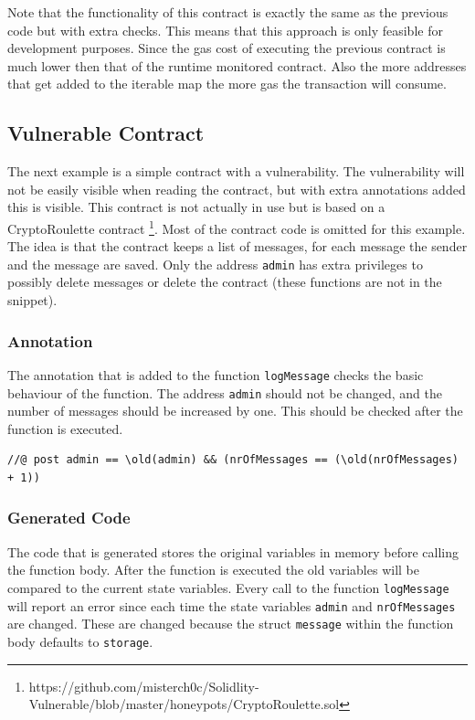 \documentclass[a4paper]{article}
\begin{document}
Note that the functionality of this contract is exactly the same as the previous code but with extra checks. This means that this approach is only feasible for development purposes. Since the gas cost of executing the previous contract is much lower then that of the runtime monitored contract. Also the more addresses that get added to the iterable map the more gas the transaction will consume.


\subsection{Vulnerable Contract}
The next example is a simple contract with a vulnerability. The vulnerability will not be easily visible when reading the contract, but with extra annotations added this is visible. This contract is not actually in use but is based on a CryptoRoulette contract \footnote{https://github.com/misterch0c/Solidlity-Vulnerable/blob/master/honeypots/CryptoRoulette.sol}. Most of the contract code is omitted for this example. The idea is that the contract keeps a list of messages, for each message the sender and the message are saved. Only the address \texttt{admin} has extra privileges to possibly delete messages or delete the contract (these functions are not in the snippet).


\subsubsection{Annotation}
The annotation that is added to the function \texttt{logMessage} checks the basic behaviour of the function. The address \texttt{admin} should not be changed, and the number of messages should be increased by one. This should be checked after the function is executed.
\begin{lstlisting}[basicstyle=\ttfamily, breaklines=true ]
//@ post admin == \old(admin) && (nrOfMessages == (\old(nrOfMessages) + 1))
\end{lstlisting}
\subsubsection{Generated Code}
The code that is generated stores the original variables in memory before calling the function body. After the function is executed the old variables will be compared to the current state variables. Every call to the function \texttt{logMessage} will report an error since each time the state variables \texttt{admin} and \texttt{nrOfMessages} are changed. These are changed because the struct \texttt{message} within the function body defaults to \texttt{storage}. 

\end{document}
